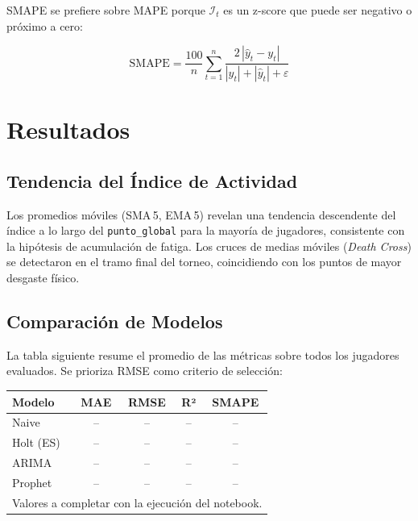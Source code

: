 \documentclass[10pt,twocolumn]{article}
\begin{document}
\noindent SMAPE se prefiere sobre MAPE porque $\mathcal{I}_t$ es un z-score que
puede ser negativo o pr\'oximo a cero:

\begin{equation}
  \text{SMAPE} = \frac{100}{n}\sum_{t=1}^{n}
    \frac{2\,|\hat{y}_t - y_t|}{|y_t| + |\hat{y}_t| + \varepsilon}
\end{equation}

\section{Resultados}

\subsection{Tendencia del Índice de Actividad}

Los promedios m\'oviles (SMA\,5, EMA\,5) revelan una tendencia descendente del
\'indice a lo largo del \texttt{punto\_global} para la mayor\'ia de jugadores,
consistente con la hip\'otesis de acumulaci\'on de fatiga.
Los cruces de medias m\'oviles (\textit{Death Cross}) se detectaron en el
tramo final del torneo, coincidiendo con los puntos de mayor desgaste f\'isico.

\subsection{Comparación de Modelos}

La tabla siguiente resume el promedio de las m\'etricas sobre todos los
jugadores evaluados. Se prioriza RMSE como criterio de selecci\'on:

\begin{center}
\small
\begin{tabular}{lcccc}
  \toprule
  \textbf{Modelo} & \textbf{MAE} & \textbf{RMSE} & \textbf{R²} & \textbf{SMAPE} \\
  \midrule
  Naive           & --   & --   & --    & -- \\
  Holt (ES)       & --   & --   & --    & -- \\
  ARIMA           & --   & --   & --    & -- \\
  Prophet         & --   & --   & --    & -- \\
  \bottomrule
  \multicolumn{5}{l}{\scriptsize Valores a completar con la ejecuci\'on del notebook.}
\end{tabular}
\end{center}
\end{document}

